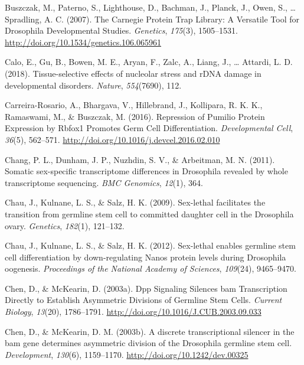 \documentclass[12pt,oneside]{reedthesis}
\newlength{\cslhangindent}
\newenvironment{cslreferences}%
  {\setlength{\parindent}{0pt}%
  \everypar{\setlength{\hangindent}{\cslhangindent}}\ignorespaces}%
  {\par}
\begin{document}
\begin{cslreferences}
\leavevmode\hypertarget{ref-buszczakCarnegieProteinTrap2007}{}%
Buszczak, M., Paterno, S., Lighthouse, D., Bachman, J., Planck, J., Owen, S., \ldots{} Spradling, A. C. (2007). The Carnegie Protein Trap Library: A Versatile Tool for Drosophila Developmental Studies. \emph{Genetics}, \emph{175}(3), 1505--1531. \url{http://doi.org/10.1534/genetics.106.065961}

\leavevmode\hypertarget{ref-Calo2018a}{}%
Calo, E., Gu, B., Bowen, M. E., Aryan, F., Zalc, A., Liang, J., \ldots{} Attardi, L. D. (2018). Tissue-selective effects of nucleolar stress and rDNA damage in developmental disorders. \emph{Nature}, \emph{554}(7690), 112.

\leavevmode\hypertarget{ref-Carreira-Rosario2016e}{}%
Carreira-Rosario, A., Bhargava, V., Hillebrand, J., Kollipara, R. K. K., Ramaswami, M., \& Buszczak, M. (2016). Repression of Pumilio Protein Expression by Rbfox1 Promotes Germ Cell Differentiation. \emph{Developmental Cell}, \emph{36}(5), 562--571. \url{http://doi.org/10.1016/j.devcel.2016.02.010}

\leavevmode\hypertarget{ref-Chang2011}{}%
Chang, P. L., Dunham, J. P., Nuzhdin, S. V., \& Arbeitman, M. N. (2011). Somatic sex-specific transcriptome differences in Drosophila revealed by whole transcriptome sequencing. \emph{BMC Genomics}, \emph{12}(1), 364.

\leavevmode\hypertarget{ref-Chau2009}{}%
Chau, J., Kulnane, L. S., \& Salz, H. K. (2009). Sex-lethal facilitates the transition from germline stem cell to committed daughter cell in the Drosophila ovary. \emph{Genetics}, \emph{182}(1), 121--132.

\leavevmode\hypertarget{ref-Chau2012}{}%
Chau, J., Kulnane, L. S., \& Salz, H. K. (2012). Sex-lethal enables germline stem cell differentiation by down-regulating Nanos protein levels during Drosophila oogenesis. \emph{Proceedings of the National Academy of Sciences}, \emph{109}(24), 9465--9470.

\leavevmode\hypertarget{ref-Chen2003o}{}%
Chen, D., \& McKearin, D. (2003a). Dpp Signaling Silences bam Transcription Directly to Establish Asymmetric Divisions of Germline Stem Cells. \emph{Current Biology}, \emph{13}(20), 1786--1791. \url{http://doi.org/10.1016/J.CUB.2003.09.033}

\leavevmode\hypertarget{ref-Chen2003q}{}%
Chen, D., \& McKearin, D. M. (2003b). A discrete transcriptional silencer in the bam gene determines asymmetric division of the Drosophila germline stem cell. \emph{Development}, \emph{130}(6), 1159--1170. \url{http://doi.org/10.1242/dev.00325}


\end{cslreferences}
\end{document}
